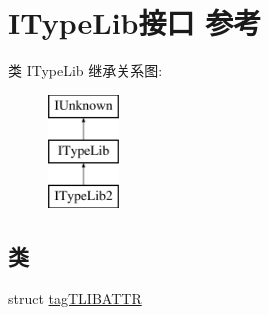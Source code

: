 \hypertarget{interface_i_type_lib}{}\section{I\+Type\+Lib接口 参考}
\label{interface_i_type_lib}
类 I\+Type\+Lib 继承关系图\+:\begin{figure}[H]
\begin{center}
\leavevmode
\includegraphics[height=3.000000cm]{interface_i_type_lib}
\end{center}
\end{figure}
\subsection*{类}
\begin{DoxyCompactItemize}
\item 
struct \hyperlink{struct_i_type_lib_1_1tag_t_l_i_b_a_t_t_r}{tag\+T\+L\+I\+B\+A\+T\+TR}
\end{DoxyCompactItemize}
